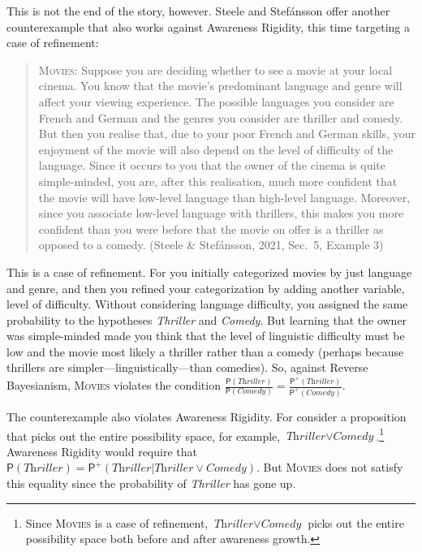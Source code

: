 \documentclass[
  11pt,
  dvipsnames,enabledeprecatedfontcommands]{scrartcl}
\newcommand{\pr}[1]{\ensuremath{\mathsf{P}(#1)}}
\newcommand{\ppr}[2]{\ensuremath{\mathsf{P}^{#1}(#2)}}
\begin{document}
This is not the end of the story, however. Steele and Stefánsson offer
another counterexample that also works against Awareness Rigidity, this
time targeting a case of refinement:

\begin{quote}
\textsc{Movies}: Suppose you are deciding whether to see a movie at your
local cinema. You know that the movie's predominant language and genre
will affect your viewing experience. The possible languages you consider
are French and German and the genres you consider are thriller and
comedy. But then you realise that, due to your poor French and German
skills, your enjoyment of the movie will also depend on the level of
difficulty of the language. Since it occurs to you that the owner of the
cinema is quite simple-minded, you are, after this realisation, much
more confident that the movie will have low-level language than
high-level language. Moreover, since you associate low-level language
with thrillers, this makes you more confident than you were before that
the movie on offer is a thriller as opposed to a comedy. (Steele \&
Stefánsson, 2021, Sec.~5, Example 3)
\end{quote}

\doublespace

\noindent This is a case of refinement. For you initially categorized
movies by just language and genre, and then you refined your
categorization by adding another variable, level of difficulty. Without
considering language difficulty, you assigned the same probability to
the hypotheses \textit{Thriller} and \textit{Comedy}. But learning that
the owner was simple-minded made you think that the level of linguistic
difficulty must be low and the movie most likely a thriller rather than
a comedy (perhaps because thrillers are simpler---linguistically---than
comedies). So, against Reverse Bayesianism, \textsc{Movies} violates the
condition
\(\frac{\pr{\textit{Thriller}}}{\pr{\textit{Comedy}}}=\frac{\ppr{+}{\textit{Thriller}}}{\ppr{+}{\textit{Comedy}}}\).

The counterexample also violates Awareness Rigidity. For consider a
proposition that picks out the entire possibility space, for example,
\(\textit{Thriller}\vee \textit{Comedy}\).\footnote{Since
  \textsc{Movies} is a case of refinement,
  \(\textit{Thriller}\vee \textit{Comedy}\) picks out the entire
  possibility space both before and after awareness growth.} Awareness
Rigidity would require that
\(\pr{\textit{Thriller}}=\ppr{+}{\textit{Thriller} \vert \textit{Thriller}\vee \textit{Comedy}}\).
But \textsc{Movies} does not satisfy this equality since the probability
of \textit{Thriller} has gone up.
\end{document}
